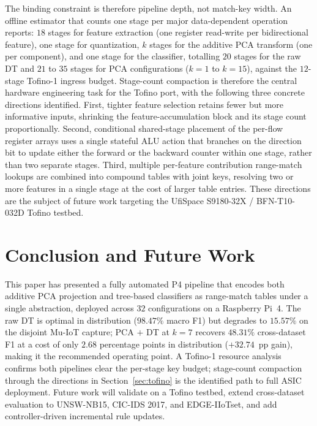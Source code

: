 \documentclass[runningheads]{llncs}
\begin{document}
The binding constraint is therefore pipeline depth, not match-key width. An offline estimator that counts one stage per major data-dependent operation reports: $18$ stages for feature extraction (one register read-write per bidirectional feature), one stage for quantization, $k$ stages for the additive PCA transform (one per component), and one stage for the classifier, totalling $20$ stages for the raw DT and $21$ to $35$ stages for PCA configurations ($k{=}1$ to $k{=}15$), against the $12$-stage Tofino-1 ingress budget. Stage-count compaction is therefore the central hardware engineering task for the Tofino port, with the following three concrete directions identified. First, tighter feature selection retains fewer but more informative inputs, shrinking the feature-accumulation block and its stage count proportionally. Second, conditional shared-stage placement of the per-flow register arrays uses a single stateful ALU action that branches on the direction bit to update either the forward or the backward counter within one stage, rather than two separate stages. Third, multiple per-feature contribution range-match lookups are combined into compound tables with joint keys, resolving two or more features in a single stage at the cost of larger table entries. These directions are the subject of future work targeting the UfiSpace S9180-32X / BFN-T10-032D Tofino testbed.

\section{Conclusion and Future Work}\label{sec:cons}

This paper has presented a fully automated P4 pipeline that encodes both additive PCA projection and tree-based classifiers as range-match tables under a single abstraction, deployed across $32$ configurations on a Raspberry Pi~4. The raw DT is optimal in distribution ($98.47\%$ macro F1) but degrades to $15.57\%$ on the disjoint Mu-IoT capture; PCA $+$ DT at $k{=}7$ recovers $48.31\%$ cross-dataset F1 at a cost of only $2.68$ percentage points in distribution ($+32.74$~pp gain), making it the recommended operating point. A Tofino-1 resource analysis confirms both pipelines clear the per-stage key budget; stage-count compaction through the directions in Section~\ref{sec:tofino} is the identified path to full ASIC deployment. Future work will validate on a Tofino testbed, extend cross-dataset evaluation to UNSW-NB15, CIC-IDS 2017, and EDGE-IIoTset, and add controller-driven incremental rule updates.
\end{document}
